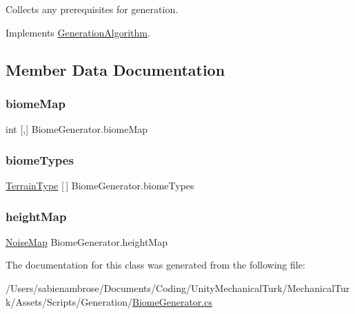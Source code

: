 Collects any prerequisites for generation. 



Implements \mbox{\hyperlink{class_generation_algorithm_a5e891b08f0c1d8f4ccc9ad06667691ec}{Generation\+Algorithm}}.



\subsection{Member Data Documentation}
\mbox{\label{class_biome_generator_a3fed4e888962415d1e2b758c33c45c81}} 
\subsubsection{\texorpdfstring{biome\+Map}{biomeMap}}
{\footnotesize\ttfamily int \mbox{[},\mbox{]} Biome\+Generator.\+biome\+Map}

\mbox{\label{class_biome_generator_a3ff1f2229659aaf0008f4c3ffd286efe}} 
\subsubsection{\texorpdfstring{biome\+Types}{biomeTypes}}
{\footnotesize\ttfamily \mbox{\hyperlink{struct_terrain_type}{Terrain\+Type}} \mbox{[}$\,$\mbox{]} Biome\+Generator.\+biome\+Types}

\mbox{\label{class_biome_generator_a26984c4131089a2ad1b9f8a2eb2c3e28}} 
\subsubsection{\texorpdfstring{height\+Map}{heightMap}}
{\footnotesize\ttfamily \mbox{\hyperlink{class_noise_map}{Noise\+Map}} Biome\+Generator.\+height\+Map}



The documentation for this class was generated from the following file\+:\begin{DoxyCompactItemize}
\item 
/\+Users/sabienambrose/\+Documents/\+Coding/\+Unity\+Mechanical\+Turk/\+Mechanical\+Turk/\+Assets/\+Scripts/\+Generation/\mbox{\hyperlink{_biome_generator_8cs}{Biome\+Generator.\+cs}}\end{DoxyCompactItemize}
